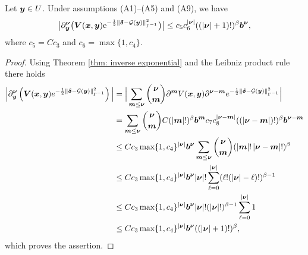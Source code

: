 \documentclass[graybox]{svmult}
\begin{document}
\begin{theorem}
Let ${\boldsymbol{y}} \in U$. Under assumptions {\rm (A1)--(A5)} and {\rm (A9)}, we have
$$
\big|\partial_{{\boldsymbol{y}}}^{{\boldsymbol{\nu}}}\big(\boldsymbol V({\boldsymbol{x}},{\boldsymbol{y}}){\rm e}^{-\frac12 \|\boldsymbol\delta-\mathcal G({\boldsymbol{y}})\|_{\Gamma^{-1}}^2}\big)\big|\leq c_5c_{6}^{|{\boldsymbol{\nu}}|} (\mathop{\left( |\boldsymbol{\nu}| + 1 \right)!})^\beta \boldsymbol{b}^{\boldsymbol{\nu}},
$$
where $c_5=Cc_3$ and $c_{6}=\max\{1,c_4\}$.
\end{theorem}
\begin{proof} 
Using Theorem \ref{thm: inverse exponential} and the Leibniz product rule there holds
    \begin{align*}
         \Big| \partial_{{\boldsymbol{y}}}^{\boldsymbol{\nu}} \left({\boldsymbol{V}}(\boldsymbol{x},\boldsymbol{y}) e^{-\frac{1}{2}\| \boldsymbol{\delta} - \mathcal{G}(\boldsymbol{y}) \|_{\Gamma^{-1}}^2} \right) \Big|  
        & =  \Big| \sum_{ \boldsymbol{m} \leq \boldsymbol{\nu}} \binom{\boldsymbol{\nu}}{\boldsymbol{m}} \partial^{\boldsymbol{m}} V(\boldsymbol{x},\boldsymbol{y}) \partial^{\boldsymbol{\nu}-\boldsymbol{m}} e^{-\frac{1}{2}\| \boldsymbol{\delta} - \mathcal{G}(\boldsymbol{y}) \|_{\Gamma^{-1}}^2} \Big|
        \\
        & = \sum_{ \boldsymbol{m} \leq \boldsymbol{\nu}} \binom{\boldsymbol{\nu}}{\boldsymbol{m}} C (\mathop{|\boldsymbol{m}|!})^\beta\boldsymbol b^{\boldsymbol m} c_7c_8^{|{\boldsymbol{\nu}}-\boldsymbol m|}((|{\boldsymbol{\nu}}-\boldsymbol m|)!)^\beta \boldsymbol b^{{\boldsymbol{\nu}}-\boldsymbol m}
        \\
        & \leq C c_3 \max\{1,c_4\}^{|{\boldsymbol{\nu}}|}\boldsymbol b^{{\boldsymbol{\nu}}}\sum_{ \boldsymbol{m} \leq \boldsymbol{\nu}} \binom{\boldsymbol{\nu}}{\boldsymbol{m}} (\mathop{|\boldsymbol{m}|!} \mathop{|\boldsymbol{\nu} - \boldsymbol{m}|!})^\beta\\
                & \leq Cc_3 \max\{1,c_4\}^{|{\boldsymbol{\nu}}|}\boldsymbol b^{{\boldsymbol{\nu}}}|{\boldsymbol{\nu}}|!\sum_{\ell=0}^{|{\boldsymbol{\nu}}|} (\mathop{\ell!} (\mathop{|\boldsymbol{\nu}| - \ell)!})^{\beta-1}
        \\
        & \leq Cc_3 \max\{1,c_4\}^{|{\boldsymbol{\nu}}|}\boldsymbol b^{{\boldsymbol{\nu}}}|{\boldsymbol{\nu}}|!(|{\boldsymbol{\nu}}|!)^{\beta-1}\sum_{\ell=0}^{|{\boldsymbol{\nu}}|} 1\\
        & \leq Cc_3\max\{1,c_4\}^{|{\boldsymbol{\nu}}|}\boldsymbol b^{{\boldsymbol{\nu}}} (\mathop{ (|\boldsymbol{\nu}| + 1)!})^\beta,
    \end{align*}
which proves the assertion.
\end{proof}
\end{document}
